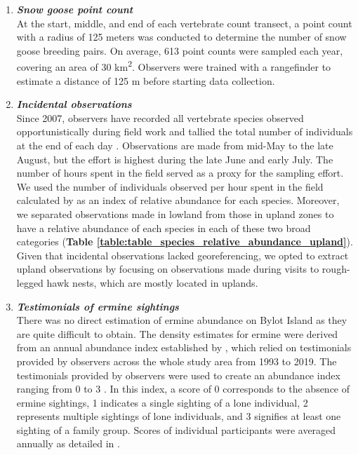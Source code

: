 \documentclass[a4paper,twoside,12pt]{article}
\begin{document}
\begin{enumerate}[label=\roman*]
\begin{figure}
 \label{figure:transects}
\end{figure}
\newpage
\item[] \textit{\textbf{Snow goose point count}}\\
At the start, middle, and end of each vertebrate count transect, a point count with a radius of 125 meters was conducted to determine the number of snow goose breeding pairs. On average, 613  point counts were sampled each year, covering an area of 30  km\textsuperscript{2}. Observers were trained with a rangefinder to estimate a distance of 125 m before starting data collection.
\\
\item[] \textit{\textbf{Incidental observations}}\\
Since 2007, observers have recorded all vertebrate species observed opportunistically during field work and tallied the total number of individuals at the end of each day \citep{gauthier2020daily, gauthier2024a}. Observations are made from mid-May to the late August, but the effort is highest during the late June and early July. The number of hours spent in the field served as a proxy for the sampling effort. We used the number of individuals observed per hour spent in the field calculated by \citet{gauthier2024a} as an index of relative abundance for each species. Moreover, we separated observations made in lowland from those in upland zones to have a relative abundance of each species in each of these two broad categories (\textbf{Table \ref{table:table_species_relative_abundance_upland}}). Given that incidental observations lacked georeferencing, we opted to extract upland observations by focusing on observations made during visits to rough-legged hawk nests, which are mostly located in uplands. \\

\newpage
\item[] \textit{\textbf{Testimonials of ermine sightings}}\\
There was no direct estimation of ermine abundance on Bylot Island as they are quite difficult to obtain. The density estimates for ermine were derived from an annual abundance index established by \citet{bolduc2023}, which relied on testimonials provided by observers across the whole study area from 1993 to 2019. The testimonials provided by observers were used to create an abundance index ranging from 0 to 3 \citep{bolduc2023}. In this index, a score of 0 corresponds to the absence of ermine sightings, 1 indicates a single sighting of a lone individual, 2 represents multiple sightings of lone individuals, and 3 signifies at least one sighting of a family group. Scores of individual participants were averaged annually as detailed in \citet{bolduc2023}. 

\end{enumerate}
\end{document}
